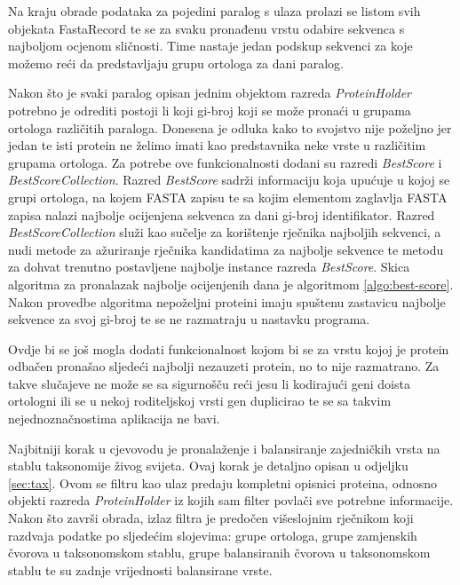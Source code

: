 Na kraju obrade podataka za pojedini paralog s ulaza prolazi se listom svih
objekata FastaRecord te se za svaku pronađenu vrstu odabire sekvenca s najboljom
ocjenom sličnosti. Time nastaje jedan podskup sekvenci za koje možemo reći da
predstavljaju grupu ortologa za dani paralog.

Nakon što je svaki paralog opisan jednim objektom razreda \emph{ProteinHolder}
potrebno je odrediti postoji li koji gi-broj koji se može pronaći u grupama
ortologa različitih paraloga. Donesena je odluka kako to svojstvo nije poželjno
jer jedan te isti protein ne želimo imati kao predstavnika neke vrste u
različitim grupama ortologa. Za potrebe ove funkcionalnosti dodani su razredi
\emph{BestScore} i \emph{BestScoreCollection}. Razred \emph{BestScore} sadrži
informaciju koja upućuje u kojoj se grupi ortologa, na kojem FASTA zapisu te sa
kojim elementom zaglavlja FASTA zapisa nalazi najbolje ocijenjena sekvenca za
dani gi-broj identifikator. Razred \emph{BestScoreCollection} služi kao sučelje
za korištenje rječnika najboljih sekvenci, a nudi metode za ažuriranje rječnika
kandidatima za najbolje sekvence te metodu za dohvat trenutno postavljene
najbolje instance razreda \emph{BestScore}. Skica algoritma za pronalazak
najbolje ocijenjenih dana je algoritmom \ref{algo:best-score}. Nakon provedbe
algoritma nepoželjni proteini imaju spuštenu zastavicu najbolje sekvence za svoj
gi-broj te se ne razmatraju u nastavku programa.



Ovdje bi se još mogla dodati funkcionalnost kojom bi se za vrstu kojoj je
protein odbačen pronašao sljedeći najbolji nezauzeti protein, no to nije
razmatrano. Za takve slučajeve ne može se sa sigurnošču reći jesu li kodirajući
geni doista ortologni ili se u nekoj roditeljskoj vrsti gen duplicirao te se sa
takvim nejednoznačnostima aplikacija ne bavi.

Najbitniji korak u cjevovodu je pronalaženje i balansiranje zajedničkih vrsta na
stablu taksonomije živog svijeta. Ovaj korak je detaljno opisan u odjeljku
\ref{sec:tax}. Ovom se filtru kao ulaz predaju kompletni opisnici proteina,
odnosno objekti razreda \emph{ProteinHolder} iz kojih sam filter povlači sve
potrebne informacije. Nakon što završi obrada, izlaz filtra je predočen
višeslojnim rječnikom koji razdvaja podatke po sljedećim slojevima: grupe
ortologa, grupe zamjenskih čvorova u taksonomskom stablu, grupe balansiranih
čvorova u taksonomskom stablu te su zadnje vrijednosti balansirane vrste.

